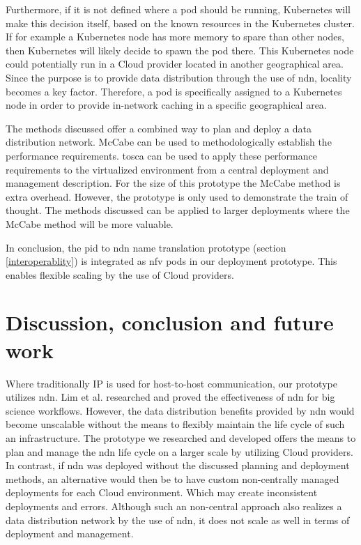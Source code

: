 \documentclass[conference]{IEEEtran}
\begin{document}
Furthermore, if it is not defined where a pod should be running, Kubernetes will make this decision itself, based on the known resources in the Kubernetes cluster. If for example a Kubernetes node has more memory to spare than other nodes, then Kubernetes will likely decide to spawn the pod there. This Kubernetes node could potentially run in a Cloud provider located in another geographical area. Since the purpose is to provide data distribution through the use of \gls{ndn}, locality becomes a key factor. Therefore, a pod is specifically assigned to a Kubernetes node in order to provide in-network caching in a specific geographical area.

The methods discussed offer a combined way to plan and deploy a data distribution network. McCabe can be used to methodologically establish the performance requirements. \gls{tosca} can be used to apply these performance requirements to the virtualized environment from a central deployment and management description. For the size of this prototype the McCabe method is extra overhead. However, the prototype is only used to demonstrate the train of thought. The methods discussed can be applied to larger deployments where the McCabe method will be more valuable.

In conclusion, the \gls{pid} to \gls{ndn} name translation prototype (section \ref{interoperablity}) is integrated as \gls{nfv} pods in our deployment prototype. This enables flexible scaling by the use of Cloud providers.

\section{Discussion, conclusion and future work}
Where traditionally IP is used for host-to-host communication, our prototype utilizes \gls{ndn}. Lim et al. researched and proved the effectiveness of \gls{ndn} for big science workflows. However, the data distribution benefits provided by \gls{ndn} would become unscalable without the means to flexibly maintain the life cycle of such an infrastructure. The prototype we researched and developed offers the means to plan and manage the \gls{ndn} life cycle on a larger scale by utilizing Cloud providers. In contrast, if \gls{ndn} was deployed without the discussed planning and deployment methods, an alternative would then be to have custom non-centrally managed deployments for each Cloud environment. Which may create inconsistent deployments and errors. Although such an non-central approach also realizes a data distribution network by the use of \gls{ndn}, it does not scale as well in terms of deployment and management.
\end{document}
